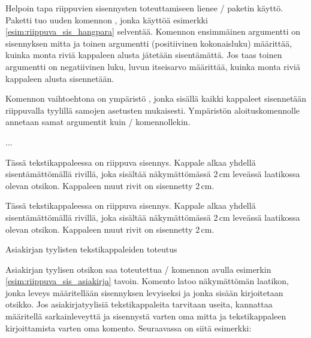 Helpoin tapa riippuvien sisennysten toteuttamiseen lienee
\-/ paketin käyttö. Paketti tuo uuden
komennon , jonka käyttöä esimerkki
\ref{esim:riippuva_sis_hangpara} selventää. Komennon ensimmäinen
argumentti on sisennyksen mitta ja toinen argumentti (positiivinen
kokonaisluku) määrittää, kuinka monta riviä kappaleen alusta jätetään
sisentämättä. Jos taas toinen argumentti on negatiivinen luku, luvun
itseisarvo määrittää, kuinka monta riviä kappaleen alusta sisennetään.

Komennon  vaihtoehtona on ympäristö
, jonka sisällä kaikki kappaleet sisennetään
riippuvalla tyylillä samojen asetusten mukaisesti. Ympäristön
aloituskomennolle annetaan samat argumentit kuin \-/
komennollekin.

\begin{koodilohkosis}
  \begin{hangparas}{2cm}{1}
    ...
  \end{hangparas}
\end{koodilohkosis}

\begin{esimerkki*}
  \komentoi{,}

\begin{koodilohko}
  Tässä tekstikappaleessa on
  riippuva sisennys. Kappale alkaa yhdellä sisentämättömällä rivillä,
  joka sisältää näkymättömässä 2\,cm leveässä laatikossa olevan otsikon.
  Kappaleen muut rivit on sisennetty 2\,cm.
\end{koodilohko}
\begin{tulos}
  Tässä tekstikappaleessa on
  riippuva sisennys. Kappale alkaa yhdellä sisentämättömällä rivillä,
  joka sisältää näkymättömässä 2\,cm leveässä laatikossa olevan otsikon.
  Kappaleen muut rivit on sisennetty 2\,cm.
\end{tulos}
\caption{Asiakirjan tyylisten tekstikappaleiden toteutus}
\label{esim:riippuva_sis_asiakirja}
\end{esimerkki*}

Asiakirjan tyylisen otsikon saa toteutettua \-/
komennon avulla esimerkin \ref{esim:riippuva_sis_asiakirja} tavoin.
Komento latoo näkymättömän laatikon, jonka leveys määritellään
sisennyksen levyiseksi ja jonka sisään kirjoitetaan otsikko. Jos
asiakirjatyylisiä tekstikappaleita tarvitaan useita, kannattaa
määritellä sarkainleveyttä ja sisennystä varten oma mitta ja
tekstikappaleen kirjoittamista varten oma komento. Seuraavassa on siitä
esimerkki:

